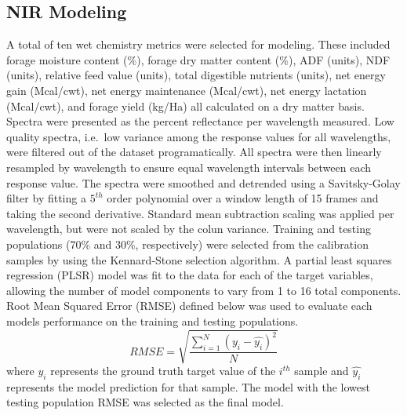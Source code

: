\documentclass[
]{article}
\begin{document}
\subsection{NIR Modeling}\label{nir-modeling}

A total of ten wet chemistry metrics were selected for modeling. These
included forage moisture content (\%), forage dry matter content (\%),
ADF (units), NDF (units), relative feed value (units), total digestible
nutrients (units), net energy gain (Mcal/cwt), net energy maintenance
(Mcal/cwt), net energy lactation (Mcal/cwt), and forage yield (kg/Ha)
all calculated on a dry matter basis. Spectra were presented as the
percent reflectance per wavelength measured. Low quality spectra,
i.e.~low variance among the response values for all wavelengths, were
filtered out of the dataset programatically. All spectra were then
linearly resampled by wavelength to ensure equal wavelength intervals
between each response value. The spectra were smoothed and detrended
using a Savitsky-Golay filter by fitting a \(5^{th}\) order polynomial
over a window length of 15 frames and taking the second derivative.
Standard mean subtraction scaling was applied per wavelength, but were
not scaled by the colun variance. Training and testing populations (70\%
and 30\%, respectively) were selected from the calibration samples by
using the Kennard-Stone selection algorithm. A partial least squares
regression (PLSR) model was fit to the data for each of the target
variables, allowing the number of model components to vary from 1 to 16
total components. Root Mean Squared Error (RMSE) defined below was used
to evaluate each models performance on the training and testing
populations. \[
RMSE = \sqrt{\frac{\sum^N_{i=1}(y_i - \hat{y_i})^2}{N}}
\] where \(y_i\) represents the ground truth target value of the
\(i^{th}\) sample and \(\hat{y_i}\) represents the model prediction for
that sample. The model with the lowest testing population RMSE was
selected as the final model.
\end{document}

